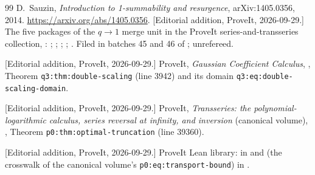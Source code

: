 \documentclass[11pt,a4paper]{article}
\numberwithin{equation}{section}
\theoremstyle{definition}
\begin{document}
\begin{thebibliography}{99}
D.~Sauzin, \emph{Introduction to 1-summability and resurgence},
arXiv:1405.0356, 2014.
\url{https://arxiv.org/abs/1405.0356}.
[Editorial addition, ProveIt, 2026-09-29.] The five packages of the
$q\to1$ merge unit in the ProveIt series-and-transseries collection,
:
;
;
;
;
.
Filed in batches 45 and 46 of ; unrefereed.

[Editorial addition, ProveIt, 2026-09-29.] ProveIt, \emph{Gaussian
Coefficient Calculus},
,
Theorem \texttt{q3:thm:double-scaling} (line 3942) and its domain
\texttt{q3:eq:double-scaling-domain}.

[Editorial addition, ProveIt, 2026-09-29.] ProveIt, \emph{Transseries: the
polynomial-logarithmic calculus, series reversal at infinity, and
inversion} (canonical volume),
,
Theorem \texttt{p0:thm:optimal-truncation} (line 39360).

[Editorial addition, ProveIt, 2026-09-29.] ProveIt Lean library:
 in
and  (the crosswalk of the canonical volume's
\texttt{p0:eq:transport-bound}) in
.
\end{thebibliography}
\end{document}
